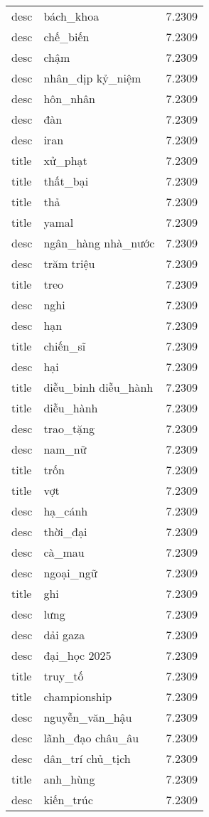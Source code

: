 \documentclass{article}
\begin{document}
\begin{tabular}{lll}
desc & bách\_khoa & 7.2309\\
desc & chế\_biến & 7.2309\\
desc & chậm & 7.2309\\
desc & nhân\_dịp kỷ\_niệm & 7.2309\\
desc & hôn\_nhân & 7.2309\\
desc & đàn & 7.2309\\
desc & iran & 7.2309\\
title & xử\_phạt & 7.2309\\
title & thất\_bại & 7.2309\\
title & thả & 7.2309\\
title & yamal & 7.2309\\
desc & ngân\_hàng nhà\_nước & 7.2309\\
desc & trăm triệu & 7.2309\\
title & treo & 7.2309\\
desc & nghi & 7.2309\\
desc & hạn & 7.2309\\
title & chiến\_sĩ & 7.2309\\
desc & hại & 7.2309\\
title & diễu\_binh diễu\_hành & 7.2309\\
title & diễu\_hành & 7.2309\\
desc & trao\_tặng & 7.2309\\
desc & nam\_nữ & 7.2309\\
title & trốn & 7.2309\\
title & vợt & 7.2309\\
desc & hạ\_cánh & 7.2309\\
desc & thời\_đại & 7.2309\\
desc & cà\_mau & 7.2309\\
desc & ngoại\_ngữ & 7.2309\\
title & ghi & 7.2309\\
desc & lưng & 7.2309\\
desc & dải gaza & 7.2309\\
desc & đại\_học 2025 & 7.2309\\
title & truy\_tố & 7.2309\\
title & championship & 7.2309\\
desc & nguyễn\_văn\_hậu & 7.2309\\
desc & lãnh\_đạo châu\_âu & 7.2309\\
desc & dân\_trí chủ\_tịch & 7.2309\\
title & anh\_hùng & 7.2309\\
desc & kiến\_trúc & 7.2309\\

\end{tabular}
\end{document}
